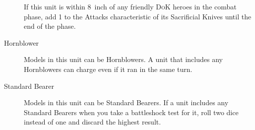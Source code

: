 \begin{description}
    \item [] If this unit is within
        8~inch of any friendly \textsc{DoK} heroes in the combat phase, add 1 to the
        Attacks characteristic of its Sacrificial Knives until the end of the
        phase. 
    \item [Hornblower] Models in this unit can be Hornblowers. A unit that
        includes any Hornblowers can charge even if it ran in the same turn.
    \item [Standard Bearer] Models in this unit can be Standard Bearers. If
        a unit includes any Standard Bearers when you take a battleshock test
        for it, roll two dice instead of one and discard the highest result.
\end{description}

\newpage %

